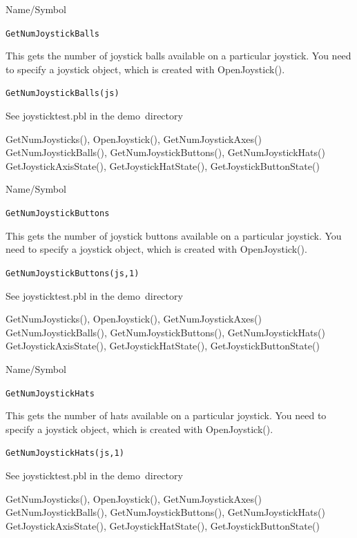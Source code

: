 \begin{desc}{Name/Symbol}
\item[Name/Symbol] \verb+GetNumJoystickBalls+ 

\item[Description]  
  This gets the number of joystick balls available on a particular joystick.  You need to specify a joystick object, which is created with OpenJoystick().  
  
\item[Usage]          \verb+GetNumJoystickBalls(js)+ 

\item[Example]
See joysticktest.pbl in the demo\ directory

\item[See Also]
GetNumJoysticks(), OpenJoystick(), GetNumJoystickAxes()
GetNumJoystickBalls(), GetNumJoystickButtons(), GetNumJoystickHats()
GetJoystickAxisState(), GetJoystickHatState(), GetJoystickButtonState()
\end{desc} 


\begin{desc}{Name/Symbol}
\item[Name/Symbol] \verb+GetNumJoystickButtons+ 

\item[Description]  
  This gets the number of joystick buttons available on a particular joystick.  You need to specify a joystick object, which is created with OpenJoystick(). 
\item[Usage]          \verb+GetNumJoystickButtons(js,1)+ 

\item[Example]
See joysticktest.pbl in the demo\ directory

\item[See Also]
GetNumJoysticks(), OpenJoystick(), GetNumJoystickAxes()
GetNumJoystickBalls(), GetNumJoystickButtons(), GetNumJoystickHats()
GetJoystickAxisState(), GetJoystickHatState(), GetJoystickButtonState()
\end{desc} 


\begin{desc}{Name/Symbol}
\item[Name/Symbol] \verb+GetNumJoystickHats+ 

\item[Description]  
  This gets the number of hats available on a particular joystick.  You need to specify a joystick object, which is created with OpenJoystick(). 
\item[Usage]          \verb+GetNumJoystickHats(js,1)+ 

\item[Example]
See joysticktest.pbl in the demo\ directory

\item[See Also]
GetNumJoysticks(), OpenJoystick(), GetNumJoystickAxes()
GetNumJoystickBalls(), GetNumJoystickButtons(), GetNumJoystickHats()
GetJoystickAxisState(), GetJoystickHatState(), GetJoystickButtonState()
\end{desc} 

